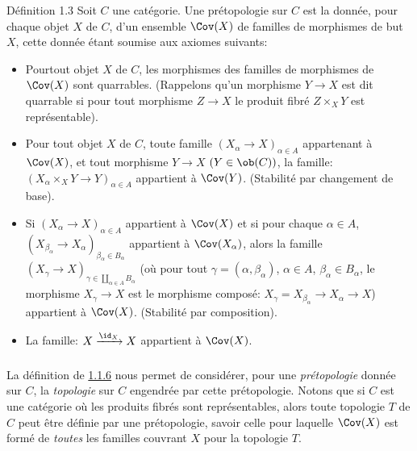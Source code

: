 \begin{enonce*}{Définition 1.3}
Soit $C$ une catégorie. Une prétopologie sur $C$ est la donnée, pour
chaque objet $X$ de $C$, d'un ensemble $\Cov(X)$ de familles de
morphismes de but $X$, cette donnée étant soumise aux axiomes
suivants:
\begin{itemize}
\item[PT 0)] Pour\pageoriginale tout objet $X$ de $C$, les morphismes
  des familles de morphismes de $\Cov(X)$ sont quarrables. (Rappelons
  qu'un morphisme $Y\rightarrow X$ est dit quarrable si pour tout
  morphisme $Z\rightarrow X$ le produit fibré $Z\times_X Y$ est
  représentable).

\item[PT 1)] Pour tout objet $X$ de $C$, toute famille
  $(X_{\alpha}\rightarrow X)_{\alpha \in A}$ appartenant à
  $\Cov(X)$, et tout morphisme $Y\rightarrow X$ $(Y\in \ob (C))$, la
  famille: $(X_{\alpha}\times_X Y\rightarrow Y)_{\alpha \in A}$
  appartient à $\Cov(Y)$. (Stabilité par changement de base).

\item[PT 2)] Si $(X_{\alpha}\rightarrow X)_{\alpha \in A}$ appartient
  à $\Cov(X)$ et si pour chaque $\alpha\in A$,
  $(X_{\beta_{\alpha}}\rightarrow X_{\alpha})_{\beta_{\alpha}\in
  B_{\alpha}}$ appartient à $\Cov(X_{\alpha})$, alors la famille
  $(X_\gamma\rightarrow X)_{\gamma\in \amalg_{\alpha\in A}B_{\alpha}}$ (où
  pour tout $\gamma=(\alpha,\beta_{\alpha})$, $\alpha\in A$,
  $\beta_{\alpha}\in B_{\alpha}$, le morphisme $X_\gamma\rightarrow X$ est
  le morphisme composé: $X_\gamma=X_{\beta_{\alpha}}\rightarrow
  X_{\alpha}\rightarrow X$) appartient à $\Cov(X)$. (Stabilité par
  composition).

\item[PT 3)] La famille: $X\xrightarrow{\id_X} X$ appartient à $\Cov(X)$.
\end{itemize}
\end{enonce*}

\setcounter{subsection}{3} \setcounter{subsubsection}{0}
\subsubsection{}

La définition de \hyperref[II.subsubsec1.1.6]{1.1.6} nous permet de considérer,
pour une \emph{prétopologie} donnée sur $C$, la \emph{topologie} sur
$C$ engendrée par cette prétopologie. Notons que si $C$ est une
catégorie où les produits fibrés sont représentables, alors toute
topologie $T$ de $C$ peut être définie par une prétopologie, savoir
celle pour laquelle $\Cov(X)$ est formé de \emph{toutes} les
familles couvrant $X$ pour la topologie $T$.

